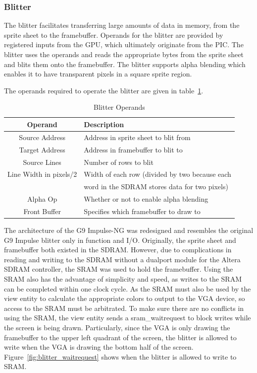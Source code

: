 \documentclass{report}
\begin{document}
\subsubsection{Blitter}
The blitter facilitates transferring large amounts of data in memory,
from the sprite sheet to the framebuffer. Operands for the blitter are
provided by registered inputs from the GPU, which ultimately originate
from the PIC. The blitter uses the operands and reads the appropriate
bytes from the sprite sheet and blits them onto the framebuffer. The
blitter supports alpha blending which enables it to have transparent pixels 
in a square sprite region.

The operands required to operate the blitter are given in
table~\ref{tab:blitter_operands}.

\begin{table}[htb!]
    \begin{center}
        \begin{tabular}{ | c | l | }
            \hline
            Operand & Description \\
            \hline
            Source Address & Address in sprite sheet to blit from \\
            \hline
            Target Address & Address in framebuffer to blit to \\
            \hline
            Source Lines & Number of rows to blit \\
            \hline
            Line Width in pixels/2 & Width of each row (divided by two
            because each \\
            & word in the SDRAM stores data for two pixels) \\
            \hline
            Alpha Op & Whether or not to enable alpha blending \\
            \hline
            Front Buffer & Specifies which framebuffer to draw to \\
            \hline
        \end{tabular}
    \end{center}
    \caption{Blitter Operands}
    \label{tab:blitter_operands}
\end{table}

The architecture of the G9 Impulse-NG was redesigned and resembles the
original G9 Impulse blitter only in function and I/O. Originally, the
sprite sheet and framebuffer both existed in the SDRAM. However, due to
complications in reading and writing to the SDRAM without a
dualport module for the Altera SDRAM controller, the SRAM was used to hold the
 framebuffer. Using the SRAM also has the advantage of
simplicity and speed, as writes to the SRAM can be completed within one
clock cycle. As the SRAM must also be used by the view entity to calculate
the appropriate colors to output to the VGA device, so access to the
SRAM must be arbitrated. To make sure there are no conflicts in using
the SRAM, the view entity sends a sram\_waitrequest to block writes while
the screen is being drawn. Particularly, since the VGA is only drawing the
framebuffer to the upper left quadrant of the screen, the blitter is
allowed to write when the VGA is drawing the bottom half of the screen.
Figure~\ref{fig:blitter_waitrequest} shows when the blitter is allowed
to write to SRAM.
\end{document}
